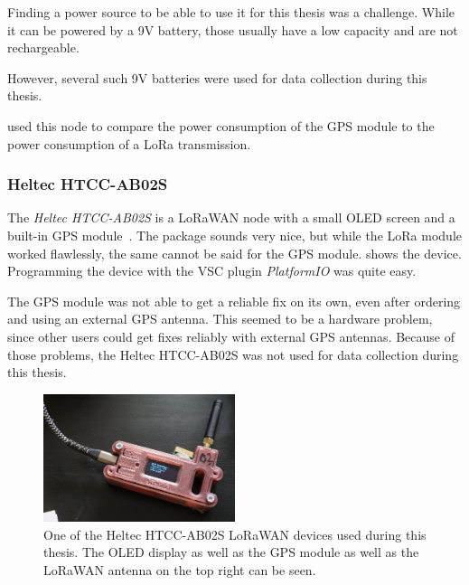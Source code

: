 Finding a power source to be able to use it for this thesis was a challenge.
While it can be powered by a 9V battery, those usually have a low capacity and are not rechargeable.

However, several such 9V batteries were used for data collection during this thesis.

 used this node to compare the power consumption of the \ac{GPS} module to the power consumption of a \ac{LoRa} transmission.

\subsubsection{Heltec HTCC-AB02S}\label{subsubsec:heltec-htcc-ab02s}

The \emph{Heltec HTCC-AB02S} is a \ac{LoRaWAN} node with a small OLED screen and a built-in \ac{GPS} module~\cite{heltec_automation_cubecell_2020}.
The package sounds very nice, but while the \ac{LoRa} module worked flawlessly, the same cannot be said for the \ac{GPS} module.
 shows the device.
Programming the device with the \ac{VSC} plugin \emph{PlatformIO} was quite easy.

The \ac{GPS} module was not able to get a reliable fix on its own, even after ordering and using an external GPS antenna.
This seemed to be a hardware problem, since other users could get fixes reliably with external \ac{GPS} antennas.
Because of those problems, the Heltec HTCC-AB02S was not used for data collection during this thesis.

\begin{figure}[htbp]
    \centering
    \includegraphics[width=0.5\textwidth]{pictures/hardware/gps-nodes/HTCC-AB02S.jpg}
    \caption{
        One of the Heltec HTCC-AB02S \ac{LoRaWAN} devices used during this thesis.
        The \ac{OLED} display as well as the \ac{GPS} module as well as the \ac{LoRaWAN} antenna on the top right can be seen.
    }\label{pic:heltec-htcc-ab02s}
\end{figure}

